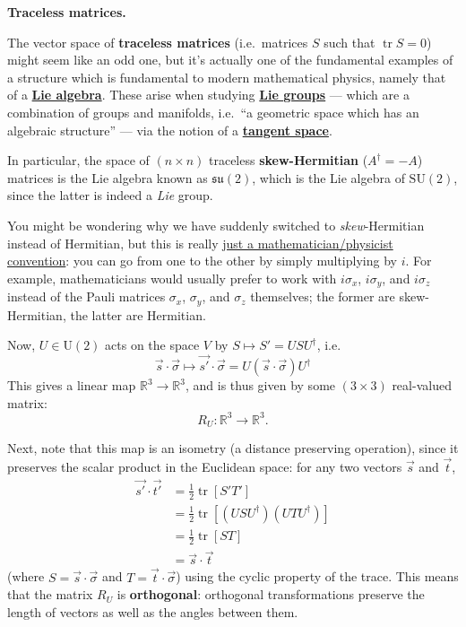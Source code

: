 \documentclass[fleqn,a4paper]{article}
\newenvironment{technical}[1]{\textbf{#1.}\par\vspace{.5\baselineskip}\everypar{\setlength{\parindent}{1.5em}}}{}
\theoremstyle{definition}
\theoremstyle{definition}
\theoremstyle{definition}
\theoremstyle{definition}
\theoremstyle{remark}
\begin{document}
\begin{technical}{Traceless matrices}
The vector space of \textbf{traceless matrices} (i.e.~matrices \(S\) such that \(\operatorname{tr}S=0\)) might seem like an odd one, but it's actually one of the fundamental examples of a structure which is fundamental to modern mathematical physics, namely that of a \href{https://en.wikipedia.org/wiki/Lie_algebra}{\textbf{Lie algebra}}.
These arise when studying \href{https://en.wikipedia.org/wiki/Lie_group}{\textbf{Lie groups}} --- which are a combination of groups and manifolds, i.e.~``a geometric space which has an algebraic structure'' --- via the notion of a \href{https://en.wikipedia.org/wiki/Tangent_space}{\textbf{tangent space}}.

In particular, the space of \((n\times n)\) traceless \textbf{skew-Hermitian} (\(A^\dagger=-A\)) matrices is the Lie algebra known as \(\mathfrak{su}(2)\), which is the Lie algebra of \(\mathrm{SU}(2)\), since the latter is indeed a \emph{Lie} group.

You might be wondering why we have suddenly switched to \emph{skew}-Hermitian instead of Hermitian, but this is really \href{https://en.wikipedia.org/wiki/Special_unitary_group\#Fundamental_representation}{just a mathematician/physicist convention}: you can go from one to the other by simply multiplying by \(i\).
For example, mathematicians would usually prefer to work with \(i\sigma_x\), \(i\sigma_y\), and \(i\sigma_z\) instead of the Pauli matrices \(\sigma_x\), \(\sigma_y\), and \(\sigma_z\) themselves; the former are skew-Hermitian, the latter are Hermitian.

\end{technical}

Now, \(U\in\mathrm{U}(2)\) acts on the space \(V\) by \(S\mapsto S' = USU^\dagger\), i.e.
\[
  \vec{s}\cdot\vec{\sigma}
  \longmapsto
  \vec{s'}\cdot\vec{\sigma}
  = U(\vec{s}\cdot\vec{\sigma})U^\dagger
\tag{$\ddagger$}
\]
This gives a linear map \(\mathbb{R}^3\to\mathbb{R}^3\), and is thus given by some \((3\times 3)\) real-valued matrix:
\[
  R_U\colon \mathbb{R}^3\to\mathbb{R}^3.
\]

Next, note that this map is an isometry (a distance preserving operation), since it preserves the scalar product in the Euclidean space: for any two vectors \(\vec{s}\) and \(\vec{t}\),
\[
  \begin{aligned}
    \vec{s'}\cdot\vec{t'}
    &= \frac{1}{2}\operatorname{tr}[S'T']
  \\&= \frac{1}{2}\operatorname{tr}[(USU^\dagger)(UTU^\dagger)]
  \\&= \frac{1}{2}\operatorname{tr}[ST]
  \\&= \vec{s}\cdot\vec{t}
  \end{aligned}
\]
(where \(S=\vec{s}\cdot\vec{\sigma}\) and \(T=\vec{t}\cdot\vec{\sigma}\)) using the cyclic property of the trace.
This means that the matrix \(R_U\) is \textbf{orthogonal}: orthogonal transformations preserve the length of vectors as well as the angles between them.
\end{document}
